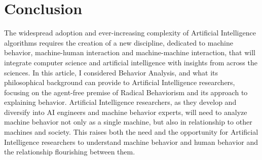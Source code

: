 \documentclass[letterpaper,11pt,twocolumn]{article}
\begin{document}
\section*{Conclusion}
The widespread adoption and ever-increasing complexity of Artificial Intelligence algorithms requires the creation of a new discipline, dedicated to machine behavior, machine-human interaction and machine-machine interaction, that will integrate computer science and artificial intelligence with insights from across the sciences. In this article, I considered Behavior Analysis, and what its philosophical background can provide to Artificial Intelligence researchers, focusing on the agent-free premise of Radical Behaviorism and its approach to explaining behavior. Artificial Intelligence researchers, as they develop and diversify into AI engineers and machine behavior experts, will need to analyze machine behavior not only as a single machine, but also in relationship to other machines and society. This raises both the need and the opportunity for Artificial Intelligence researchers to understand machine behavior and human behavior and the relationship flourishing between them.

\printbibliography
\end{document}
